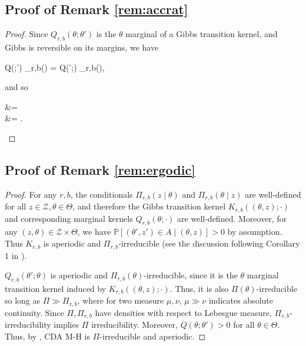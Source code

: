\documentclass[12pt]{article}
\newcommand{\be}{\begin{equs}}
\newcommand{\ee}{\end{equs}}
\newcommand{\bb}[1]{\mathbb{#1}}
\newcommand{\mc}[1]{\mathcal{#1}}
\begin{document}
\subsection{Proof of Remark \ref{rem:accrat}}
\begin{proof}
Since $Q_{r,b}(\theta;\theta')$ is the $\theta$ marginal of a Gibbs transition kernel, and Gibbs is reversible on its margins, we have
\be
Q(\theta;\theta') \Pi_{r,b}(\theta) = Q(\theta';\theta) \Pi_{r,b}(\theta),
\ee 
and so
\be
{} &=  \\
&= .
\ee
\end{proof}

\subsection{Proof of Remark \ref{rem:ergodic}}
\begin{proof}
For any $r,b$, the conditionals $\Pi_{r,b}(z \mid \theta)$ and $\Pi_{r,b}(\theta \mid z)$ are well-defined for all $z \in \mc Z, \theta \in \Theta$, and therefore the Gibbs transition kernel $K_{r,b}((\theta,z);\cdot)$ and corresponding marginal kernels $Q_{r,b}(\theta;\cdot)$ are well-defined. Moreover, for any $(z,\theta) \in \mc Z \times \Theta$, we have $\bb P[(\theta',z') \in A \mid (\theta,z)] > 0$ by assumption. Thus $K_{r,b}$ is aperiodic and $\Pi_{r,b}$-irreducible (see the discussion following Corollary 1 in \cite{roberts1994simple}).

$Q_{r,b}(\theta';\theta)$ is aperiodic and $\Pi_{r,b}(\theta)$-irreducible, since it is the $\theta$ marginal transition kernel induced by $K_{r,b}((\theta,z);\cdot)$. Thus, it is also $\Pi(\theta)$-irreducible so long as $\Pi \gg \Pi_{r,b}$, where for two measure $\mu,\nu$, $\mu \gg \nu$ indicates absolute continuity. Since $\Pi, \Pi_{r,b}$ have densities with respect to Lebesgue measure, $\Pi_{r,b}$-irreducibility implies $\Pi$ irreducibility. Moreover, $Q(\theta;\theta') > 0$ for all $\theta \in \Theta$. Thus, by \cite[Theorem 3]{roberts1994simple}, CDA M-H is $\Pi$-irreducible and aperiodic. 
\end{proof}
\end{document}
